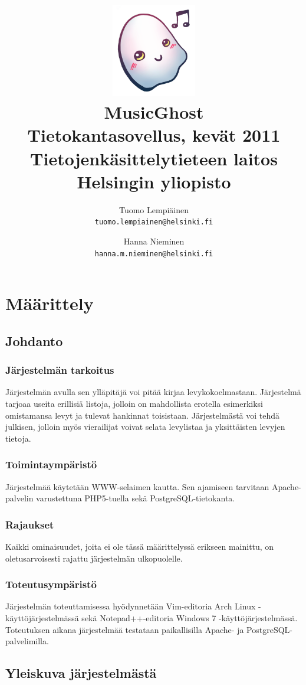 \documentclass[a4paper,12pt]{report}
\title{\includegraphics[width=5em]{logo}\\\vspace{1em}MusicGhost\\\vspace{1em}
  \large{Tietokantasovellus, kevät 2011\\Tietojenkäsittelytieteen
  laitos\\Helsingin yliopisto}\\}
\author{Tuomo Lempiäinen\\\texttt{tuomo.lempiainen@helsinki.fi} \and
Hanna Nieminen\\\texttt{hanna.m.nieminen@helsinki.fi}}
\begin{document}
\maketitle

\tableofcontents

\chapter{Määrittely}

\section{Johdanto}

\subsection{Järjestelmän tarkoitus}
Järjestelmän avulla sen ylläpitäjä voi pitää kirjaa levykokoelmastaan.
Järjestelmä tarjoaa useita erillisiä listoja, jolloin on mahdollista
erotella esimerkiksi omistamansa levyt ja tulevat hankinnat toisistaan.
Järjestelmästä voi tehdä julkisen, jolloin myös vierailijat voivat selata
levylistaa ja yksittäisten levyjen tietoja.

\subsection{Toimintaympäristö}
Järjestelmää käytetään WWW-selaimen kautta. Sen ajamiseen tarvitaan
Apache-palvelin varustettuna PHP5-tuella sekä PostgreSQL-tietokanta.

\subsection{Rajaukset}
Kaikki ominaisuudet, joita ei ole tässä määrittelyssä erikseen mainittu, on
oletusarvoisesti rajattu järjestelmän ulkopuolelle.

\subsection{Toteutusympäristö}
Järjestelmän toteuttamisessa hyödynnetään Vim-editoria Arch Linux
-käyttöjärjestelmässä sekä Notepad++-editoria Windows 7
-käyttöjärjestelmässä. Toteutuksen aikana järjestelmää testataan
paikallisilla Apache- ja PostgreSQL-palvelimilla.

\section{Yleiskuva järjestelmästä}
\end{document}

